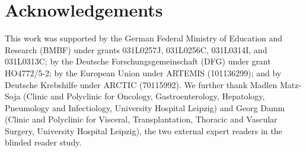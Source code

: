 \documentclass{bmvc2k}
\begin{document}
\section*{Acknowledgements}

This work was supported by the German Federal Ministry of Education and Research (BMBF)
under grants 031L0257J, 031L0256C, 031L0314I, and 031L0313C; by the Deutsche
Forschungsgemeinschaft (DFG) under grant HO4772/5-2; by the European Union under
ARTEMIS (101136299); and by Deutsche Krebshilfe under ARCTIC (70115992).
We further thank Madlen Matz-Soja (Clinic and Polyclinic for Oncology,
Gastroenterology, Hepatology, Pneumology and Infectiology, University Hospital Leipzig)
and Georg Damm (Clinic and Polyclinic for Visceral, Transplantation, Thoracic and
Vascular Surgery, University Hospital Leipzig), the two external expert readers in the
blinded reader study.


\end{document}
